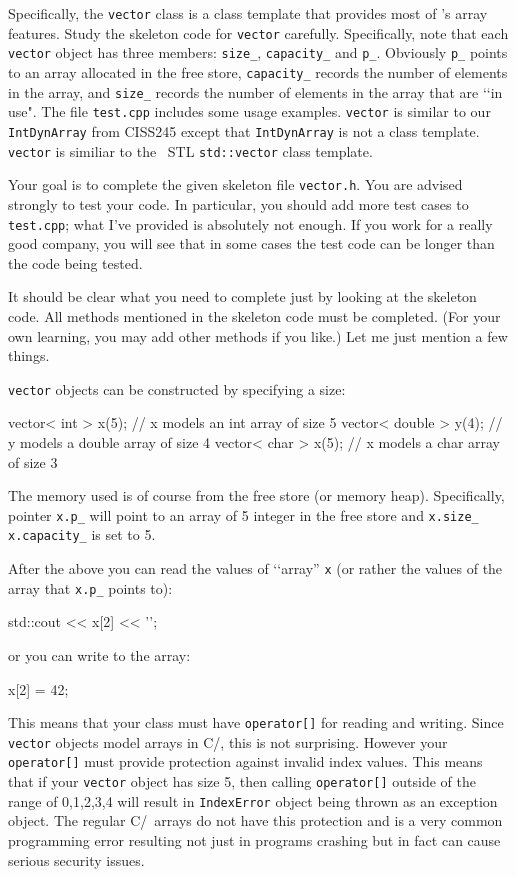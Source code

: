 Specifically, the \verb!vector! class is a class template
that provides most of \cpp's array features.
Study the skeleton code for \verb!vector! carefully.
Specifically, note that each \verb!vector! object has three members:
\verb!size_!, \verb!capacity_! and \verb!p_!.
Obviously \verb!p_! points to an array allocated in the free store,
\verb!capacity_! records the number of elements in the array, and
\verb!size_! records the number of elements in the array that are \lq\lq in
use".
The file \verb!test.cpp! includes some usage examples.
\verb!vector! is similar to our \verb!IntDynArray! from CISS245 except that
\verb!IntDynArray! is not a class template.
\verb!vector! is similiar to the \cpp\ STL \verb!std::vector! class
template.

Your goal is to complete the given
skeleton file \verb!vector.h!.
You are advised strongly to test your code.
In particular, you should add more test cases to \verb!test.cpp!;
what I've provided is absolutely not enough.
If you work for a really good company, you will see
that in some cases the test code can be longer than the code
being tested.

It should be clear what you need to complete just by looking at the
skeleton code.
All methods mentioned in the skeleton code must be completed.
(For your own learning, you may add other methods if you like.)
Let me just mention a few things.

\verb!vector! objects can be constructed by specifying a size:
\begin{console}[fontsize=\footnotesize]
vector< int > x(5);    // x models an int array of size 5
vector< double > y(4); // y models a double array of size 4
vector< char > x(5);   // x models a char array of size 3
\end{console}
The memory used is of course from the free store (or memory heap).
Specifically, pointer \verb!x.p_! will point to an array
of 5 integer in the free store and 
\verb!x.size_!
\verb!x.capacity_!
is set to 5.

After the above you can read the values of \lq\lq array'' \verb!x!
(or rather the values of the array that \verb!x.p_! points to):
\begin{console}[fontsize=\footnotesize]
std::cout << x[2] << '\n';
\end{console}
or you can write to the array:
{\small
\begin{console}
x[2] = 42;
\end{console}
}
This means that your class must have
\verb!operator[]! for reading and writing.
Since \verb!vector! objects model arrays in C/\cpp, this is not 
surprising.
However your \verb!operator[]! must provide protection
against invalid index values.
This means that if your \verb!vector! object has size 5,
then calling \verb!operator[]! outside of the
range of 0,1,2,3,4 will result in 
\verb!IndexError! object being thrown as an exception object.
The regular C/\cpp\ arrays do not have this protection
and is a very common programming error resulting not just in 
programs crashing but in fact can cause serious
security issues.

